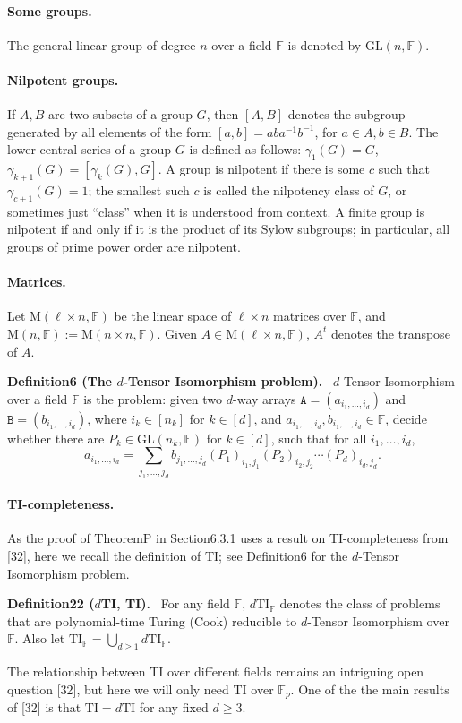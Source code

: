 \documentclass[10pt,a4paper]{article}
\newenvironment{authorclaim}[1]{\par\medskip\noindent\textbf{#1.}\ }{\par\medskip}
\begin{document}
\paragraph{Some groups.} The general linear group of degree $n$ over a field $\mathbb F$ is denoted by $\mathrm{GL}(n,\mathbb F)$.
\paragraph{Nilpotent groups.} If $A,B$ are two subsets of a group $G$, then $[A,B]$ denotes the subgroup generated by all elements of the form $[a,b]=aba^{-1}b^{-1}$, for $a\in A,b\in B$. The lower central series of a group $G$ is defined as follows: $\gamma_1(G)=G$, $\gamma_{k+1}(G)=[\gamma_k(G),G]$. A group is nilpotent if there is some $c$ such that $\gamma_{c+1}(G)=1$; the smallest such $c$ is called the nilpotency class of $G$, or sometimes just ``class'' when it is understood from context. A finite group is nilpotent if and only if it is the product of its Sylow subgroups; in particular, all groups of prime power order are nilpotent.
\paragraph{Matrices.} Let $\mathrm M(\ell\times n,\mathbb F)$ be the linear space of $\ell\times n$ matrices over $\mathbb F$, and $\mathrm M(n,\mathbb F):=\mathrm M(n\times n,\mathbb F)$. Given $A\in\mathrm M(\ell\times n,\mathbb F)$, $A^t$ denotes the transpose of $A$.
\begin{authorclaim}{Definition6 (The $d$-Tensor Isomorphism problem)}
$d$-Tensor Isomorphism over a field $\mathbb F$ is the problem: given two $d$-way arrays $\mathtt A=(a_{i_1,\ldots,i_d})$ and $\mathtt B=(b_{i_1,\ldots,i_d})$, where $i_k\in[n_k]$ for $k\in[d]$, and $a_{i_1,\ldots,i_d},b_{i_1,\ldots,i_d}\in\mathbb F$, decide whether there are $P_k\in\mathrm{GL}(n_k,\mathbb F)$ for $k\in[d]$, such that for all $i_1,\ldots,i_d$,
\[a_{i_1,\ldots,i_d}=\sum_{j_1,\ldots,j_d}b_{j_1,\ldots,j_d}(P_1)_{i_1,j_1}(P_2)_{i_2,j_2}\cdots(P_d)_{i_d,j_d}.\]
\end{authorclaim}
\paragraph{TI-completeness.} As the proof of TheoremP in Section6.3.1 uses a result on TI-completeness from [32], here we recall the definition of TI; see Definition6 for the $d$-Tensor Isomorphism problem.
\begin{authorclaim}{Definition22 ($d$TI, TI)}
For any field $\mathbb F$, $d\mathrm{TI}_{\mathbb F}$ denotes the class of problems that are polynomial-time Turing (Cook) reducible to $d$-Tensor Isomorphism over $\mathbb F$. Also let $\mathrm{TI}_{\mathbb F}=\bigcup_{d\ge1}d\mathrm{TI}_{\mathbb F}$.
\end{authorclaim}
The relationship between TI over different fields remains an intriguing open question [32], but here we will only need TI over $\mathbb F_p$. One of the the main results of [32] is that $\mathrm{TI}=d\mathrm{TI}$ for any fixed $d\ge3$.
\end{document}
